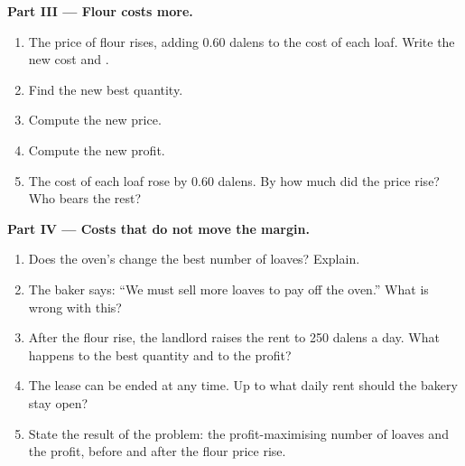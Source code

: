 \begin{problem}
\medskip
\noindent\textbf{Part III --- Flour costs more.}
\begin{enumerate}[resume]
\item The price of flour rises, adding 0.60 dalens to the cost of each loaf. Write the new cost and .
\item Find the new best quantity.
\item Compute the new price.
\item Compute the new profit.
\item The cost of each loaf rose by 0.60 dalens. By how much did the price rise? Who bears the rest?
\end{enumerate}

\medskip
\noindent\textbf{Part IV --- Costs that do not move the margin.}
\begin{enumerate}[resume]
\item Does the oven's  change the best number of loaves? Explain.
\item The baker says: ``We must sell more loaves to pay off the oven.'' What is wrong with this?
\item After the flour rise, the landlord raises the rent to 250 dalens a day. What happens to the best quantity and to the profit?
\item The lease can be ended at any time. Up to what daily rent should the bakery stay open?
\item State the result of the problem: the profit-maximising number of loaves and the profit, before and after the flour price rise.
\end{enumerate}
\end{problem}
